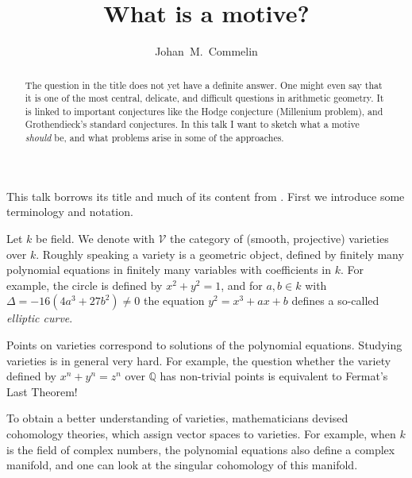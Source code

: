 \documentclass[a4paper,10pt]{article}
\title{What is a motive?}
\author{Johan~M.~Commelin}
\begin{document}
\maketitle

\begin{abstract} %
	The question in the title does not yet have a definite answer. One
	might even say that it is one of the most central, delicate, and
	difficult questions in arithmetic geometry. It is linked to important
	conjectures like the Hodge conjecture (Millenium problem), and
	Grothendieck's standard conjectures. In this talk I want to sketch what
	a motive \emph{should} be, and what problems arise in some of the
	approaches.
\end{abstract} %

This talk borrows its title and much of its content from \cite{mazur,milne}.
First we introduce some terminology and notation.

Let $k$ be field. We denote with $\mathcal{V}$ the category of (smooth,
projective) varieties over $k$. Roughly speaking a variety is a geometric
object, defined by finitely many polynomial equations in finitely many
variables with coefficients in $k$. For example, the circle is defined by
$x^{2} + y^{2} = 1$, and for $a,b \in k$ with $\Delta = -16(4a^{3} + 27b^{2})
\ne 0$ the equation $y^{2} = x^{3} + ax + b$ defines a so-called \emph{elliptic
curve}.

Points on varieties correspond to solutions of the polynomial equations.
Studying varieties is in general very hard. For example, the question whether
the variety defined by $x^{n} + y^{n} = z^{n}$ over $\mathbb{Q}$ has
non-trivial points is equivalent to Fermat's Last Theorem!

To obtain a better understanding of varieties, mathematicians devised
cohomology theories, which assign vector spaces to varieties. For example, when
$k$ is the field of complex numbers, the polynomial equations also define a
complex manifold, and one can look at the singular cohomology of this manifold.



\end{document}
